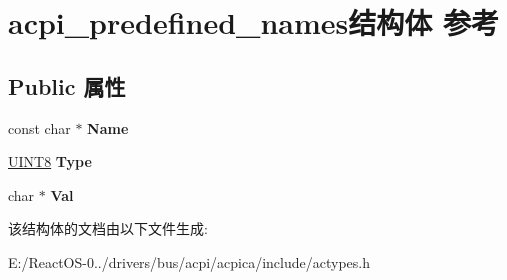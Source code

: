 \hypertarget{structacpi__predefined__names}{}\section{acpi\+\_\+predefined\+\_\+names结构体 参考}
\label{structacpi__predefined__names}
\subsection*{Public 属性}
\begin{DoxyCompactItemize}
\item 
\mbox{\label{structacpi__predefined__names_ac4cb8623b6a68d321303c1299860c536}} 
const char $\ast$ {\bfseries Name}
\item 
\mbox{\label{structacpi__predefined__names_a4477163cb00cee9d60c49029470f7489}} 
\hyperlink{_processor_bind_8h_ab27e9918b538ce9d8ca692479b375b6a}{U\+I\+N\+T8} {\bfseries Type}
\item 
\mbox{\label{structacpi__predefined__names_a4375e412eb863dc1da25bd79746a87ba}} 
char $\ast$ {\bfseries Val}
\end{DoxyCompactItemize}


该结构体的文档由以下文件生成\+:\begin{DoxyCompactItemize}
\item 
E\+:/\+React\+O\+S-\/0../drivers/bus/acpi/acpica/include/actypes.\+h\end{DoxyCompactItemize}
